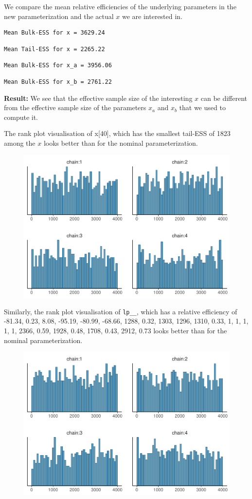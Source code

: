 \documentclass[american,]{article}
\begin{document}
We compare the mean relative efficiencies of the underlying parameters
in the new parameterization and the actual \(x\) we are interested in.

\begin{verbatim}
Mean Bulk-ESS for x = 3629.24
\end{verbatim}

\begin{verbatim}
Mean Tail-ESS for x = 2265.22
\end{verbatim}

\begin{verbatim}
Mean Bulk-ESS for x_a = 3956.06
\end{verbatim}

\begin{verbatim}
Mean Bulk-ESS for x_b = 2761.22
\end{verbatim}

\textbf{Result:} We see that the effective sample size of the
interesting \(x\) can be different from the effective sample size of the
parameters \(x_a\) and \(x_b\) that we used to compute it.

The rank plot visualisation of x{[}40{]}, which has the smallest
tail-ESS of 1823 among the \(x\) looks better than for the nominal
parameterization.

\begin{figure}[t]
  \centering
  \includegraphics[width=0.6\linewidth]{graphics/hist-fit-alt1-2-1.pdf}
\end{figure}

Similarly, the rank plot visualisation of \texttt{lp\_\_}, which has a
relative efficiency of -81.34, 0.23, 8.08, -95.19, -80.99, -68.66, 1288,
0.32, 1303, 1296, 1310, 0.33, 1, 1, 1, 1, 1, 2366, 0.59, 1928, 0.48,
1708, 0.43, 2912, 0.73 looks better than for the nominal
parameterization.

\begin{figure}[t]
  \centering
  \includegraphics[width=0.6\linewidth]{graphics/hist-fit-alt1-lp-1.pdf}
\end{figure}
\end{document}
